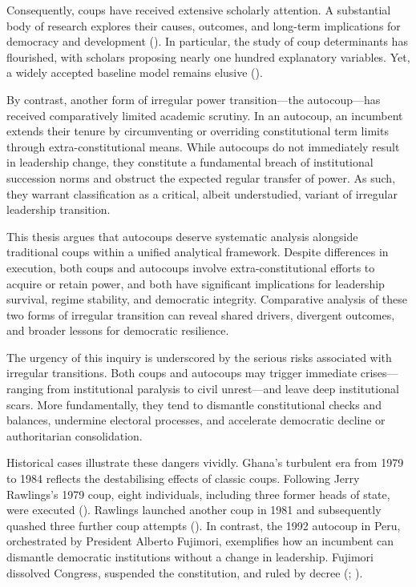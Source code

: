 \documentclass[
  12pt,
]{report}
\begin{document}
Consequently, coups have received extensive scholarly attention. A
substantial body of research explores their causes, outcomes, and
long-term implications for democracy and development
(). In particular, the
study of coup determinants has flourished, with scholars proposing
nearly one hundred explanatory variables. Yet, a widely accepted
baseline model remains elusive ().

By contrast, another form of irregular power transition---the
autocoup---has received comparatively limited academic scrutiny. In an
autocoup, an incumbent extends their tenure by circumventing or
overriding constitutional term limits through extra-constitutional
means. While autocoups do not immediately result in leadership change,
they constitute a fundamental breach of institutional succession norms
and obstruct the expected regular transfer of power. As such, they
warrant classification as a critical, albeit understudied, variant of
irregular leadership transition.

This thesis argues that autocoups deserve systematic analysis alongside
traditional coups within a unified analytical framework. Despite
differences in execution, both coups and autocoups involve
extra-constitutional efforts to acquire or retain power, and both have
significant implications for leadership survival, regime stability, and
democratic integrity. Comparative analysis of these two forms of
irregular transition can reveal shared drivers, divergent outcomes, and
broader lessons for democratic resilience.

The urgency of this inquiry is underscored by the serious risks
associated with irregular transitions. Both coups and autocoups may
trigger immediate crises---ranging from institutional paralysis to civil
unrest---and leave deep institutional scars. More fundamentally, they
tend to dismantle constitutional checks and balances, undermine
electoral processes, and accelerate democratic decline or authoritarian
consolidation.

Historical cases illustrate these dangers vividly. Ghana's turbulent era
from 1979 to 1984 reflects the destabilising effects of classic coups.
Following Jerry Rawlings's 1979 coup, eight individuals, including three
former heads of state, were executed
(). Rawlings launched another
coup in 1981 and subsequently quashed three further coup attempts
(). In contrast, the 1992
autocoup in Peru, orchestrated by President Alberto Fujimori,
exemplifies how an incumbent can dismantle democratic institutions
without a change in leadership. Fujimori dissolved Congress, suspended
the constitution, and ruled by decree
(;
).
\end{document}
